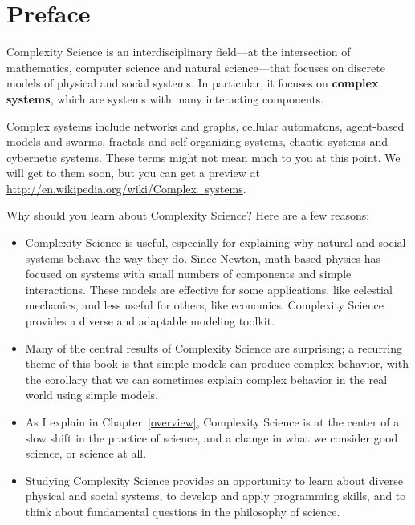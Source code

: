 \documentclass[12pt]{book}
\theoremstyle{exercise}
\begin{document}
\fi

\chapter{Preface}
\label{preface}

Complexity Science is an interdisciplinary
field---at the intersection of mathematics, computer science and
natural science---that focuses on discrete models of physical and
social systems.  In particular, it focuses on {\bf complex systems},
which are systems with many interacting components.


Complex systems include networks and graphs, cellular automatons,
agent-based models and swarms, fractals and self-organizing
systems, chaotic systems and cybernetic systems.  These terms
might not mean much to you at this point.  We will get to them
soon, but you can get a preview at
\url{http://en.wikipedia.org/wiki/Complex_systems}.

Why should you learn about Complexity Science?  Here are a few reasons:

\begin{itemize}

\item Complexity Science is useful, especially for explaining why natural and social systems behave the way they do.  Since Newton, math-based physics has focused on systems with small numbers of components and simple interactions.  These models are effective for some applications, like celestial mechanics, and less useful for others, like economics.  Complexity Science provides a diverse and adaptable modeling toolkit. 

\item Many of the central results of Complexity Science are surprising; a recurring theme of this book is that simple models can produce complex behavior, with the corollary that we can sometimes explain complex behavior in the real world using simple models.

\item As I explain in Chapter~\ref{overview}, Complexity Science is at the center of a slow shift in the practice of science, and a change in what we consider good science, or science at all.

\item Studying Complexity Science provides an opportunity to learn about diverse physical and social systems, to develop and apply programming skills, and to think about fundamental questions in the philosophy of science.

\end{itemize}
\end{document}
